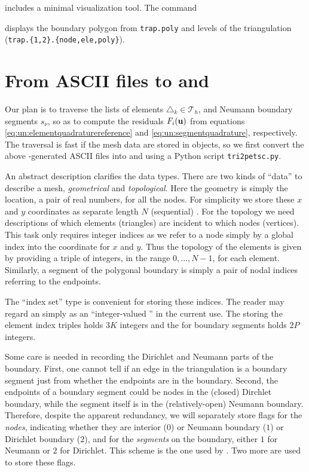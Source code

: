 \Triangle includes a minimal visualization tool.  The command
displays the boundary polygon from \texttt{trap.poly} and levels of the triangulation (\texttt{trap.\{1,2\}.\{node,ele,poly\}}).


\section{From ASCII files to \PETSc \pVecs and \pISs}

Our plan is to traverse the lists of elements $\triangle_k \in {}_h$, and Neumann boundary segments $s_\nu$, so as to compute the residuals $F_i(\mathbf{u})$ from equations \eqref{eq:un:elementquadraturereference} and \eqref{eq:un:segmentquadrature}, respectively.  The traversal is fast if the mesh data are stored in \PETSc objects, so we first convert the above \Triangle-generated ASCII files into \pVecs and \pISs using a Python script \texttt{tri2petsc.py}.

An abstract description clarifies the data types.  There are two kinds of ``data'' to describe a mesh, \emph{geometrical} and \emph{topological}.  Here the geometry is simply the location, a pair of real numbers, for all the nodes.  For simplicity we store these $x$ and $y$ coordinates as separate length $N$ (sequential) \pVecs.  For the topology we need descriptions of which elements (triangles) are incident to which nodes (vertices).  This task only requires integer indices as we refer to a node simply by a global index into the coordinate \pVecs for $x$ and $y$.  Thus the topology of the elements is given by providing a triple of integers, in the range $0,\dots,N-1$, for each element.  Similarly, a segment of the polygonal boundary is simply a pair of nodal indices referring to the endpoints.

The \PETSc \pIS ``index set'' type is convenient for storing these indices.  The reader may regard an \pIS simply as an ``integer-valued \pVec'' in the current use.  The \pIS storing the element index triples holds $3K$ integers and the \pIS for boundary segments holds $2P$ integers.

Some care is needed in recording the Dirichlet and Neumann parts of the boundary.  First, one cannot tell if an edge in the triangulation is a boundary segment just from whether the endpoints are in the boundary.  Second, the endpoints of a boundary segment could be nodes in the (closed) Dirchlet boundary, while the segment itself is in the (relatively-open) Neumann boundary.  Therefore, despite the apparent redundancy, we will separately store flags for the \emph{nodes}, indicating whether they are interior ($0$) or Neumann boundary ($1$) or Dirichlet boundary ($2$), and for the \emph{segments} on the boundary, either $1$ for Neumann or $2$ for Dirichlet.  This scheme is the one used by \Triangle.  Two more \pISs are used to store these flags.


